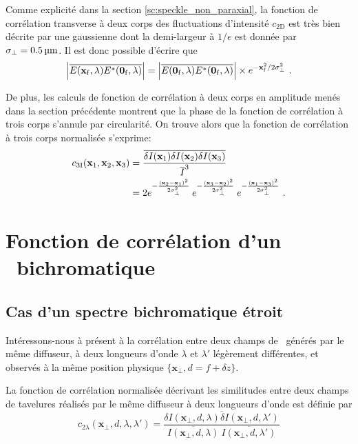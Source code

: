 Comme explicité dans la section \ref{sc:speckle_non_paraxial}, la fonction de corrélation transverse à deux corps des fluctuations d'intensité $c_{\mathrm{2D}}$ est très bien décrite par une gaussienne dont la demi-largeur à $1/e$ est donnée par $\sigma_{\perp}=\SI{0.5}{\micro\metre}$. Il est donc possible d'écrire que
\begin{equation}
\left|\overline{E(\mathbf{x}_{\mathrm{f}},\lambda)E^*(\mathbf{0}_{\mathrm{f}},\lambda)}\right|=\left|\overline{E(\mathbf{0}_{\mathrm{f}},\lambda)E^*(\mathbf{0}_{\mathrm{f}},\lambda)} \right| \times e^{-\mathbf{x}_{\mathrm{f}}^2/2\sigma_{\perp}^2} \text{ .}
\end{equation}

De plus, les calculs de fonction de corrélation à deux corps en amplitude menés dans la section précédente montrent que la phase de la fonction de corrélation à trois corps s'annule par circularité. On trouve alors que la fonction de corrélation à trois corps normalisée s'exprime:
\begin{align}
c_{\mathrm{3I}}(\mathbf{x}_1,\mathbf{x}_2,\mathbf{x}_3) &= \frac{\overline{\delta I(\mathbf{x}_1) \delta I(\mathbf{x}_2) \delta I(\mathbf{x}_3)}}{\overline{I}^3}\\
&= 2 e^{-\frac{(\mathbf{x}_2-\mathbf{x}_1)^2}{2\sigma_{\perp}^2}} \: e^{-\frac{(\mathbf{x}_3-\mathbf{x}_2)^2}{2\sigma_{\perp}^2}} \: e^{-\frac{(\mathbf{x}_1-\mathbf{x}_3)^2}{2\sigma_{\perp}^2}} \text{ .}
\end{align}






\section{Fonction de corrélation d'un \speckle\ bichromatique}
\subsection{Cas d'un spectre bichromatique étroit}
Intéressons-nous à présent à la corrélation entre deux champs de \speckle\ générés par le même diffuseur, à deux longueurs d'onde $\lambda$ et $\lambda'$ légèrement différentes, et observés à la même position physique $\lbrace \mathbf{x}_{\perp}, d=f+\delta z \rbrace$.


La fonction de corrélation normalisée décrivant les similitudes entre deux champs de tavelures réalisés par le même diffuseur à deux longueurs d'onde est définie par
\begin{equation}
c_{2\lambda}(\mathbf{x}_{\perp},d,\lambda, \lambda')=\frac{\overline{\delta I (\mathbf{x}_{\perp},d,\lambda) \delta I (\mathbf{x}_{\perp},d,\lambda')}}{\overline{I(\mathbf{x}_{\perp},d,\lambda)}\:\overline{I(\mathbf{x}_{\perp},d,\lambda')}}
\end{equation}

